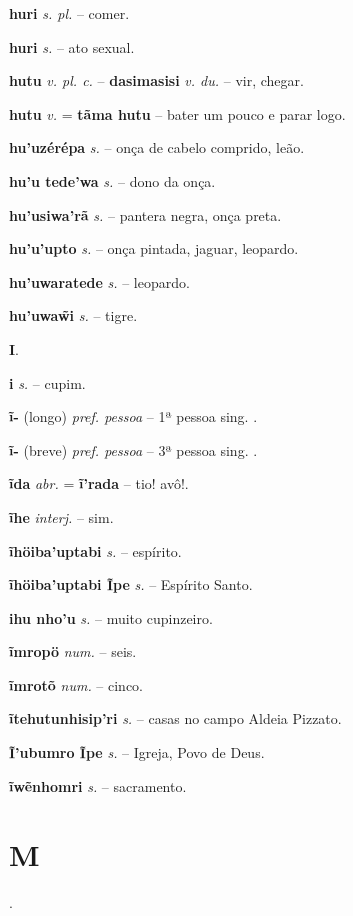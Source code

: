 \textbf{huri} \textit{s. pl.} -- comer.

\textbf{huri} \textit{s.} -- ato sexual.

\textbf{hutu} \textit{v. pl. c.} -- \textbf{dasimasisi} \textit{v. du.} -- vir, chegar.

\textbf{hutu} \textit{v.} = \textbf{tãma hutu} -- bater um pouco e parar logo.

\textbf{hu'uzérépa} \textit{s.} -- onça de cabelo comprido, leão.

\textbf{hu'u tede'wa} \textit{s.} -- dono da onça.

\textbf{hu'usiwa'rã} \textit{s.} -- pantera negra, onça preta.

\textbf{hu'u'upto} \textit{s.} -- onça pintada, jaguar, leopardo.

\textbf{hu'uwaratede} \textit{s.} -- leopardo.

\textbf{hu'uwaw̃i} \textit{s.} -- tigre.



\textbf{I}.



\textbf{i} \textit{s.} -- cupim.

\textbf{ĩ-} (longo) \textit{pref. pessoa} -- 1ª pessoa sing. .

\textbf{ĩ-} (breve) \textit{pref. pessoa} -- 3ª pessoa sing. .

\textbf{ĩda} \textit{abr.} = \textbf{ĩ'rada} -- tio! avô!.

\textbf{ĩhe} \textit{interj.} -- sim.

\textbf{ĩhöiba'uptabi} \textit{s.} -- espírito.

\textbf{ĩhöiba'uptabi Ĩpe} \textit{s.} -- Espírito Santo.

\textbf{ihu nho'u} \textit{s.} -- muito cupinzeiro.

\textbf{ĩmropö} \textit{num.} -- seis.

\textbf{ĩmrotõ} \textit{num.} -- cinco.

\textbf{ĩtehutunhisip'ri} \textit{s.} -- casas no campo  Aldeia Pizzato.

\textbf{Ĩ'ubumro Ĩpe} \textit{s.} -- Igreja, Povo de Deus.

\textbf{ĩwẽnhomri} \textit{s.} -- sacramento.


\section*{M}.



